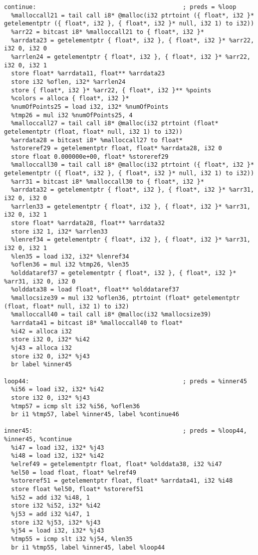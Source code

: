 \documentclass[main.tex]{subfiles}
\begin{document}
{\begin{lstlisting}
continue:                                         ; preds = %loop
  %malloccall21 = tail call i8* @malloc(i32 ptrtoint ({ float*, i32 }* getelementptr ({ float*, i32 }, { float*, i32 }* null, i32 1) to i32))
  %arr22 = bitcast i8* %malloccall21 to { float*, i32 }*
  %arrdata23 = getelementptr { float*, i32 }, { float*, i32 }* %arr22, i32 0, i32 0
  %arrlen24 = getelementptr { float*, i32 }, { float*, i32 }* %arr22, i32 0, i32 1
  store float* %arrdata11, float** %arrdata23
  store i32 %oflen, i32* %arrlen24
  store { float*, i32 }* %arr22, { float*, i32 }** %points
  %colors = alloca { float*, i32 }*
  %numOfPoints25 = load i32, i32* %numOfPoints
  %tmp26 = mul i32 %numOfPoints25, 4
  %malloccall27 = tail call i8* @malloc(i32 ptrtoint (float* getelementptr (float, float* null, i32 1) to i32))
  %arrdata28 = bitcast i8* %malloccall27 to float*
  %storeref29 = getelementptr float, float* %arrdata28, i32 0
  store float 0.000000e+00, float* %storeref29
  %malloccall30 = tail call i8* @malloc(i32 ptrtoint ({ float*, i32 }* getelementptr ({ float*, i32 }, { float*, i32 }* null, i32 1) to i32))
  %arr31 = bitcast i8* %malloccall30 to { float*, i32 }*
  %arrdata32 = getelementptr { float*, i32 }, { float*, i32 }* %arr31, i32 0, i32 0
  %arrlen33 = getelementptr { float*, i32 }, { float*, i32 }* %arr31, i32 0, i32 1
  store float* %arrdata28, float** %arrdata32
  store i32 1, i32* %arrlen33
  %lenref34 = getelementptr { float*, i32 }, { float*, i32 }* %arr31, i32 0, i32 1
  %len35 = load i32, i32* %lenref34
  %oflen36 = mul i32 %tmp26, %len35
  %olddataref37 = getelementptr { float*, i32 }, { float*, i32 }* %arr31, i32 0, i32 0
  %olddata38 = load float*, float** %olddataref37
  %mallocsize39 = mul i32 %oflen36, ptrtoint (float* getelementptr (float, float* null, i32 1) to i32)
  %malloccall40 = tail call i8* @malloc(i32 %mallocsize39)
  %arrdata41 = bitcast i8* %malloccall40 to float*
  %i42 = alloca i32
  store i32 0, i32* %i42
  %j43 = alloca i32
  store i32 0, i32* %j43
  br label %inner45

loop44:                                           ; preds = %inner45
  %i56 = load i32, i32* %i42
  store i32 0, i32* %j43
  %tmp57 = icmp slt i32 %i56, %oflen36
  br i1 %tmp57, label %inner45, label %continue46

inner45:                                          ; preds = %loop44, %inner45, %continue
  %i47 = load i32, i32* %j43
  %i48 = load i32, i32* %i42
  %elref49 = getelementptr float, float* %olddata38, i32 %i47
  %el50 = load float, float* %elref49
  %storeref51 = getelementptr float, float* %arrdata41, i32 %i48
  store float %el50, float* %storeref51
  %i52 = add i32 %i48, 1
  store i32 %i52, i32* %i42
  %j53 = add i32 %i47, 1
  store i32 %j53, i32* %j43
  %j54 = load i32, i32* %j43
  %tmp55 = icmp slt i32 %j54, %len35
  br i1 %tmp55, label %inner45, label %loop44


\end{lstlisting}}
\end{document}
